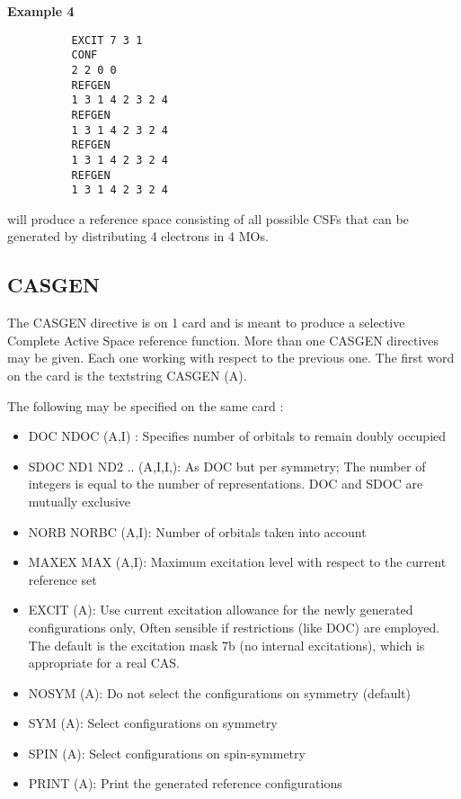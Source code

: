 \documentclass[11pt,fleqn]{article}
\begin{document}
{\bf Example 4}
{
\footnotesize
\begin{verbatim}
          EXCIT 7 3 1
          CONF
          2 2 0 0
          REFGEN
          1 3 1 4 2 3 2 4
          REFGEN
          1 3 1 4 2 3 2 4
          REFGEN
          1 3 1 4 2 3 2 4
          REFGEN
          1 3 1 4 2 3 2 4
\end{verbatim}
}

will produce a reference space consisting of all possible CSFs
that can be generated by distributing 4 electrons in 4 MOs.

\subsection[CASGEN]{CASGEN }

The CASGEN directive is on 1 card and is meant to produce a
selective Complete Active Space reference function. More than
one CASGEN directives may be given. Each one working with respect
to the previous one. The first word on the card is the
textstring CASGEN (A).

The following may be specified on the same card :
\begin{itemize}
\item DOC NDOC (A,I) : Specifies number of orbitals to remain 
                       doubly occupied
\item SDOC ND1 ND2 .. (A,I,I,): As DOC but per symmetry; The number
                                of integers is equal to the number 
                                of representations.
      DOC and SDOC are mutually exclusive
\item NORB NORBC (A,I): Number of orbitals taken into account
\item MAXEX MAX (A,I): Maximum excitation level with respect to the
                       current reference set
\item EXCIT (A): Use current excitation allowance for the newly
                 generated configurations only, Often sensible if 
                 restrictions (like DOC) are employed. The default is
                 the excitation mask 7b (no internal excitations), which
                 is appropriate for a real CAS.
\item NOSYM (A): Do not select the configurations on symmetry (default)
\item SYM   (A): Select configurations on symmetry
\item SPIN  (A): Select configurations on spin-symmetry
\item PRINT (A): Print the generated reference configurations
\end{itemize}
\end{document}
